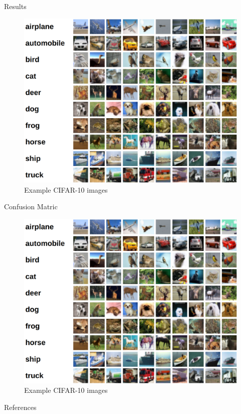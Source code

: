\documentclass{beamer}
\begin{document}
\begin{frame}{Results}
	\begin{figure}
		\includegraphics[width=.65\textwidth]{../Images/cifar-10.png}
		\caption{Example CIFAR-10 images \cite{cifar10}}
	\end{figure}
\end{frame}

\begin{frame}{Confusion Matric}
	\begin{figure}
		\includegraphics[width=.65\textwidth]{../Images/cifar-10.png}
		\caption{Example CIFAR-10 images \cite{cifar10}}
	\end{figure}
\end{frame}


\begin{frame}[allowframebreaks]{References}
\printbibliography
\end{frame}
\end{document}
